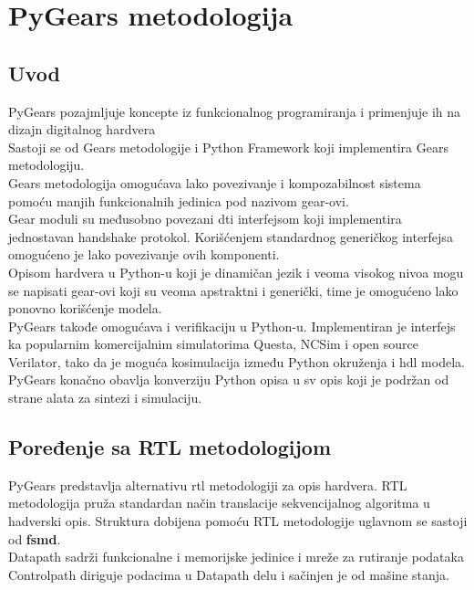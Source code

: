 \section{PyGears metodologija} \label{pygears_sec}

\subsection{Uvod}

PyGears\cite{pygears_site} pozajmljuje koncepte iz funkcionalnog programiranja i primenjuje ih na
dizajn digitalnog hardvera \\
Sastoji se od Gears metodologije i Python Framework koji implementira Gears metodologiju. \\
Gears metodologija omogućava lako povezivanje i kompozabilnost sistema pomoću manjih
funkcionalnih jedinica pod nazivom gear-ovi. \\
Gear moduli su međusobno povezani \gls{dti} interfejsom koji implementira jednostavan
handshake protokol.
Korišćenjem standardnog generičkog interfejsa omogućeno je lako povezivanje ovih
komponenti. \\

Opisom hardvera u Python-u koji je dinamičan jezik i veoma visokog nivoa mogu se
napisati gear-ovi koji su veoma apstraktni i generički, time je omogućeno lako
ponovno korišćenje modela. \\

PyGears takođe omogućava i verifikaciju u Python-u. Implementiran je interfejs
ka popularnim komercijalnim simulatorima Questa, NCSim i open source Verilator,
tako da je moguća kosimulacija između Python okruženja i \gls{hdl} modela. \\

PyGears konačno obavlja konverziju Python opisa u \gls{sv} opis koji
je podržan od strane alata za sintezi i simulaciju.

\subsection{Poređenje sa RTL metodologijom}

PyGears\cite{PyGears_OSDA} predstavlja alternativu \gls{rtl}\cite{chu2006rtl} metodologiji za opis hardvera.
RTL metodologija pruža standardan način translacije sekvencijalnog algoritma u
hadverski opis.
Struktura dobijena pomoću RTL metodologije uglavnom se sastoji od \textbf{\gls{fsmd}}. \\
Datapath sadrži funkcionalne i memorijske jedinice i mreže za rutiranje podataka\cite{PSDS_5} \\
Controlpath diriguje podacima u Datapath delu i sačinjen je od mašine stanja.\\

